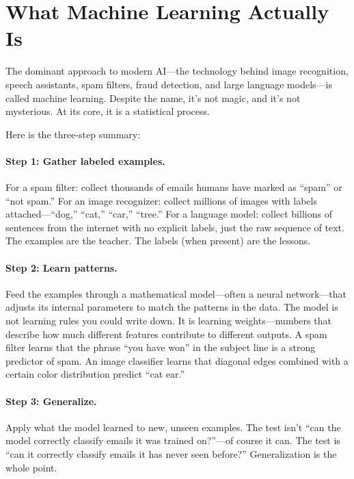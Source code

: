 \section{What Machine Learning Actually Is}

The dominant approach to modern AI---the technology behind image recognition, speech assistants, spam filters, fraud detection, and large language models---is called machine learning. Despite the name, it's not magic, and it's not mysterious. At its core, it is a statistical process.

Here is the three-step summary:

\paragraph{Step 1: Gather labeled examples.} For a spam filter: collect thousands of emails humans have marked as ``spam'' or ``not spam.'' For an image recognizer: collect millions of images with labels attached---``dog,'' ``cat,'' ``car,'' ``tree.'' For a language model: collect billions of sentences from the internet with no explicit labels, just the raw sequence of text. The examples are the teacher. The labels (when present) are the lessons.

\paragraph{Step 2: Learn patterns.} Feed the examples through a mathematical model---often a neural network---that adjusts its internal parameters to match the patterns in the data. The model is not learning rules you could write down. It is learning weights---numbers that describe how much different features contribute to different outputs. A spam filter learns that the phrase ``you have won'' in the subject line is a strong predictor of spam. An image classifier learns that diagonal edges combined with a certain color distribution predict ``cat ear.''

\paragraph{Step 3: Generalize.} Apply what the model learned to new, unseen examples. The test isn't ``can the model correctly classify emails it was trained on?''---of course it can. The test is ``can it correctly classify emails it has never seen before?'' Generalization is the whole point.


